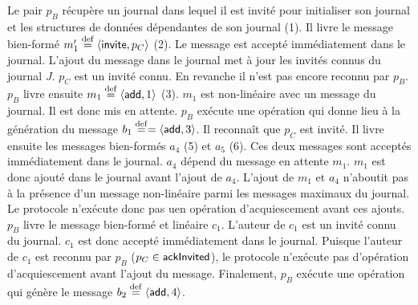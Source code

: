 \medskip

Le pair $p_B$ récupère un journal dans lequel il est invité pour initialiser son journal et les structures de données dépendantes de son journal (1).
Il livre le message bien-formé $m_1' \defeq \tuple*{\trm{invite}, p_C}$ (2).
Le message est accepté immédiatement dans le journal.
L'ajout du message dans le journal met à jour les invités connus du journal $J$.
$p_C$ est un invité connu.
En revanche il n'est pas encore reconnu par $p_B$.
$p_B$ livre ensuite $m_1 \defeq \tuple*{\trm{add}, 1}$ (3).
$m_1$ est non-linéaire avec un message du journal.
Il est donc mis en attente.
$p_B$ exécute une opération qui donne lieu à la génération du message $b_1 \defeq = \tuple*{\trm{add}, 3}$.
Il reconnaît que $p_C$ est invité.
Il livre ensuite les messages bien-formés $a_4$ (5) et $a_5$ (6).
Ces deux messages sont acceptés immédiatement dans le journal.
$a_4$ dépend du message en attente $m_1$.
$m_1$ est donc ajouté dans le journal avant l'ajout de $a_4$.
L'ajout de $m_1$ et $a_4$ n'aboutit pas à la présence d'un message non-linéaire parmi les messages maximaux du journal.
Le protocole n'exécute donc pas uen opération d'acquiescement avant ces ajouts.
$p_B$ livre le message bien-formé et linéaire $c_1$.
L'auteur de $c_1$ est un invité connu du journal.
$c_1$ est donc accepté immédiatement dans le journal.
Puisque l'auteur de $c_1$ est reconnu par $p_B$ ($p_C \in \trm{ackInvited}$), le protocole n'exécute pas d'opération d'acquiescement avant l'ajout du message.
Finalement, $p_B$ exécute une opération qui génère le message $b_2 \defeq \tuple*{\trm{add},4}$.

\medskip

